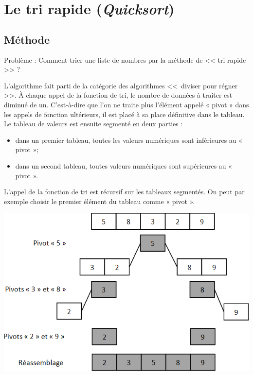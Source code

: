 \documentclass[10pt,fleqn]{article} %
\begin{document}

\section{Le tri rapide (\textit{Quicksort})}

\subsection{Méthode}

\begin{exemple}
Problème : Comment trier une liste de nombres par la méthode de  << tri rapide >> ?
\end{exemple}
\begin{minipage}[c]{.48\linewidth}
L'algorithme fait parti de la catégorie des algorithmes <<~diviser pour régner >>.
À chaque appel de la fonction de tri, le nombre de données à traiter est diminué de un. C'est-à-dire que l'on ne traite plus l'élément appelé « pivot » dans les appels de fonction ultérieurs, il est placé à sa place définitive dans le tableau.
Le tableau de valeurs est ensuite segmenté en deux parties :
\begin{itemize}
\item dans un premier tableau, toutes les valeurs numériques sont inférieures au « pivot »;
\item dans un second tableau, toutes valeurs numériques sont supérieures au « pivot ».
\end{itemize}

L'appel de la fonction de tri est récursif sur les tableaux segmentés.
On peut par exemple choisir le premier élément du tableau comme « pivot ».
\end{minipage} \hfill
\begin{minipage}[c]{.48\linewidth}
\begin{center}
\includegraphics[width=\linewidth]{images/graphe_1}
\end{center}
\end{minipage}
\end{document}
